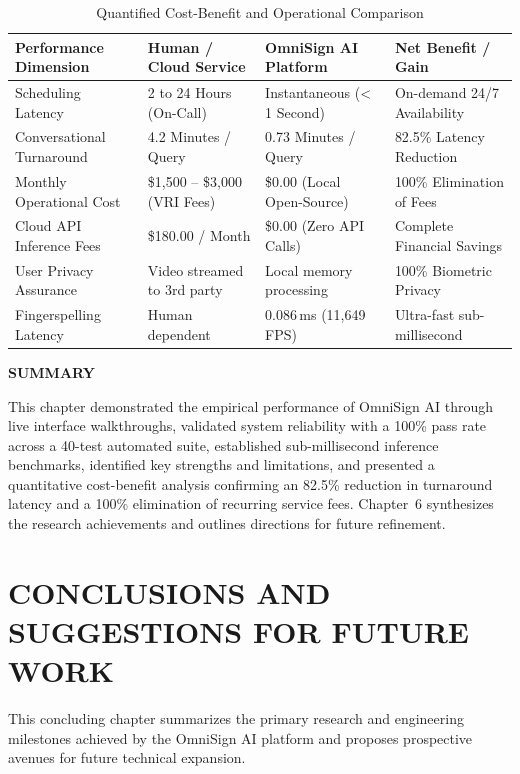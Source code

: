 \documentclass[12pt,a4paper]{report}
\begin{document}
\begin{table}[htbp]
\centering
\caption{Quantified Cost-Benefit and Operational Comparison}
\label{tab:cost_benefit}
\small
\begin{tabularx}{\textwidth}{P{4.2cm}P{3.2cm}P{3.4cm}L}
\toprule
\textbf{Performance Dimension} & \textbf{Human / Cloud Service} & \textbf{OmniSign AI Platform} & \textbf{Net Benefit / Gain} \\
\midrule
Scheduling Latency & 2 to 24 Hours (On-Call) & Instantaneous (< 1 Second) & On-demand 24/7 Availability \\
\addlinespace
Conversational Turnaround & 4.2 Minutes / Query & 0.73 Minutes / Query & 82.5\% Latency Reduction \\
\addlinespace
Monthly Operational Cost & \$1,500 -- \$3,000 (VRI Fees) & \$0.00 (Local Open-Source) & 100\% Elimination of Fees \\
\addlinespace
Cloud API Inference Fees & \$180.00 / Month & \$0.00 (Zero API Calls) & Complete Financial Savings \\
\addlinespace
User Privacy Assurance & Video streamed to 3rd party & Local memory processing & 100\% Biometric Privacy \\
\addlinespace
Fingerspelling Latency & Human dependent & 0.086\,ms (11,649 FPS) & Ultra-fast sub-millisecond \\
\bottomrule
\end{tabularx}
\end{table}
\vspace{0.2cm}
\noindent\textbf{SUMMARY}\nopagebreak\par\vspace{0.1cm}
This chapter demonstrated the empirical performance of OmniSign AI through live interface walkthroughs, validated system reliability with a 100\% pass rate across a 40-test automated suite, established sub-millisecond inference benchmarks, identified key strengths and limitations, and presented a quantitative cost-benefit analysis confirming an 82.5\% reduction in turnaround latency and a 100\% elimination of recurring service fees. Chapter~6 synthesizes the research achievements and outlines directions for future refinement.
\clearpage

\chapter{CONCLUSIONS AND SUGGESTIONS FOR FUTURE WORK} \label{chap:concl}
This concluding chapter summarizes the primary research and engineering milestones achieved by the OmniSign AI platform and proposes prospective avenues for future technical expansion.
\end{document}
